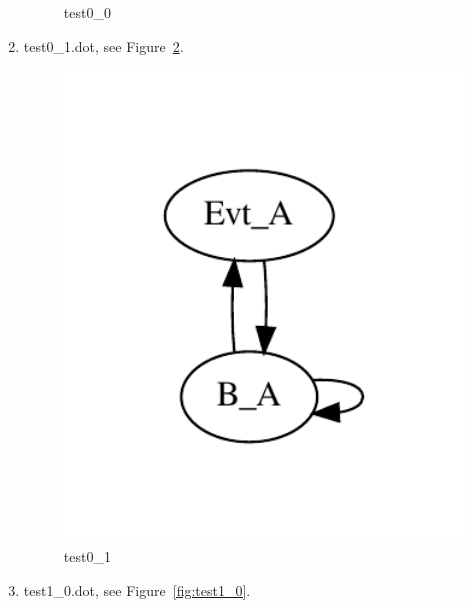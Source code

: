 \documentclass[12pt,a4paper]{report}
\begin{document}
\begin{enumerate}
\begin{figure}
        \caption{test0\_0}
        \label{fig:test0_0}
    \end{figure}
\item test0\_1.dot, see Figure~\ref{fig:test0_1}.
    \begin{figure}
        \centering
        \includegraphics*[width=1.0\textwidth,keepaspectratio]{TestPattern/test0_1.pdf}
        \caption{test0\_1}
        \label{fig:test0_1}
    \end{figure}
\item test1\_0.dot, see Figure~\ref{fig:test1_0}.
    \begin{figure}
        \centering

\end{figure}
\end{enumerate}
\end{document}
